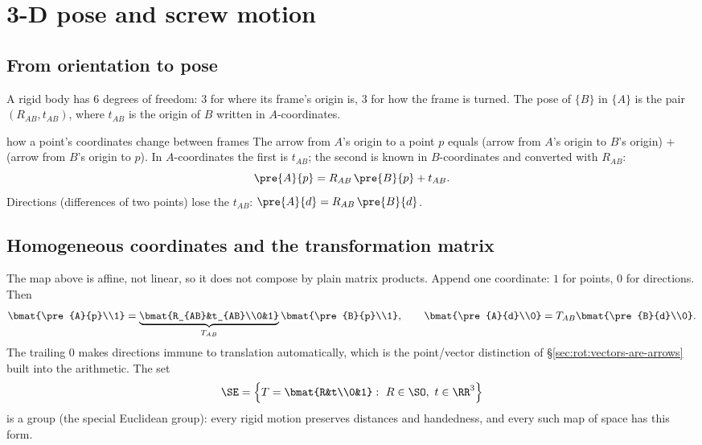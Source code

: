 \section{3-D pose and screw motion}\label{sec:rot:pose-and-screws}

\subsection{From orientation to pose}\label{sec:rot:orientation-pose}
A rigid body has 6 degrees of freedom: 3 for where its frame's origin is, 3 for how the frame is turned. The pose of $\{B\}$ in $\{A\}$ is the pair $(R_{AB},t_{AB})$, where $t_{AB}$ is the origin of $B$ written in $A$-coordinates.

\begin{deriv}{how a point's coordinates change between frames}
The arrow from $A$'s origin to a point $p$ equals (arrow from $A$'s origin to $B$'s origin) $+$ (arrow from $B$'s origin to $p$). In $A$-coordinates the first is $t_{AB}$; the second is known in $B$-coordinates and converted with $R_{AB}$:
\[
\pre{A}{p}=R_{AB}\,\pre{B}{p}+t_{AB}.
\]
Directions (differences of two points) lose the $t_{AB}$: $\pre{A}{d}=R_{AB}\,\pre{B}{d}$.
\end{deriv}

\subsection{Homogeneous coordinates and the transformation matrix}\label{sec:rot:homog}\label{sec:rot:homogeneous-coordinates-transformation}
The map above is affine, not linear, so it does not compose by plain matrix products. Append one coordinate: $1$ for points, $0$ for directions. Then
\[
\bmat{\pre{A}{p}\\1}=\underbrace{\bmat{R_{AB}&t_{AB}\\0&1}}_{T_{AB}}\bmat{\pre{B}{p}\\1},\qquad
\bmat{\pre{A}{d}\\0}=T_{AB}\bmat{\pre{B}{d}\\0}.
\]
The trailing $0$ makes directions immune to translation automatically, which is the point/vector distinction of \S\ref{sec:rot:vectors-are-arrows} built into the arithmetic. The set
\[
\SE=\Big\{T=\bmat{R&t\\0&1}:\ R\in\SO,\ t\in\RR^3\Big\}
\]
is a group (the special Euclidean group): every rigid motion preserves distances and handedness, and every such map of space has this form.

